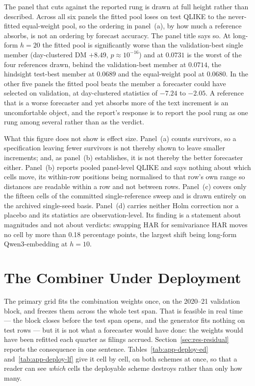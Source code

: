 The panel that cuts against the reported rung is drawn at full height rather
than described. Across all six panels the fitted pool loses on test QLIKE to
the never-fitted equal-weight pool, so the ordering in panel~(a), by how
much a reference absorbs, is not an ordering by forecast accuracy. The
panel title says so. At long-form $h=20$ the fitted pool is significantly
worse than the validation-best single member (day-clustered DM $+8.49$,
$p \approx 10^{-16}$) and at $0.0731$ is the worst of the four references
drawn, behind the validation-best member at $0.0714$, the hindsight test-best
member at $0.0689$ and the equal-weight pool at $0.0680$. In the other five
panels the fitted pool beats the member a forecaster could have selected on
validation, at day-clustered statistics of $-7.24$ to $-2.05$. %
A reference that is a worse forecaster and yet absorbs more of the text
increment is an uncomfortable object, and the report's response is to report
the pool rung as one rung among several rather than as the verdict.

What this figure does not show is effect size. Panel~(a) counts survivors, so
a specification leaving fewer survivors is not thereby shown to leave smaller
increments; and, as panel~(b) establishes, it is not thereby the better
forecaster either. Panel~(b) reports pooled panel-level QLIKE and says nothing
about which cells move, its within-row positions being normalised to that
row's own range so distances are readable within a row and not between rows.
Panel~(c) covers only the fifteen cells of the committed single-reference
sweep and is drawn entirely on the archived single-seed basis. Panel~(d)
carries neither Holm correction nor a placebo and its statistics are
observation-level. Its finding is a statement about magnitudes and not about
verdicts: swapping HAR for semivariance HAR moves no cell by more than 0.18
percentage points, the largest shift being long-form Qwen3-embedding at
$h=10$. %

\FloatBarrier
\section{The Combiner Under Deployment}
\label{app:res-deploy}

The primary grid fits the combination weights once, on the 2020--21
validation block, and freezes them across the whole test span. That is feasible
in real time --- the block closes before the test span opens, and the generator
fits nothing on test rows --- but it is not what a forecaster would have done:
the weights would have been refitted each quarter as filings accrued. %
Section~\ref{sec:res-residual} reports the consequence in one sentence.
Tables~\ref{tab:app-deploy-ed} and~\ref{tab:app-deploy-lf} give it cell by
cell, on both schemes at once, so that a reader can see \emph{which} cells
the deployable scheme destroys rather than only how many.

